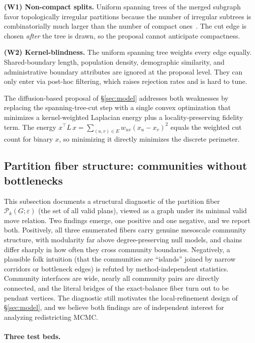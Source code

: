 \documentclass[11pt]{article}
\begin{document}
\textbf{(W1) Non-compact splits.} Uniform spanning trees of the
merged subgraph favor topologically irregular partitions because the
number of irregular subtrees is combinatorially much larger than the
number of compact ones~\cite{deford2021recombination,deford2019total}.
The cut edge is chosen \emph{after} the tree is drawn, so the
proposal cannot anticipate compactness.

\textbf{(W2) Kernel-blindness.} The uniform spanning tree weights
every edge equally. Shared-boundary length, population density,
demographic similarity, and administrative boundary attributes are
ignored at the proposal level. They can only enter via post-hoc
filtering, which raises rejection rates and is hard to tune.

The diffusion-based proposal of \S\ref{sec:model} addresses both
weaknesses by replacing the spanning-tree-cut step with a single
convex optimization that minimizes a kernel-weighted Laplacian energy
plus a locality-preserving fidelity term. The energy
$x^\top L\, x = \sum_{(u,v) \in E} w_{uv} (x_u - x_v)^2$ equals the
weighted cut count for binary $x$, so minimizing it directly minimizes
the discrete perimeter.

\subsection{Partition fiber structure: communities without bottlenecks}\label{sec:fiber-corridors}

This subsection documents a structural diagnostic of the partition fiber
$\mathcal{P}_k(G; \varepsilon)$ (the set of all valid plans), viewed as a graph under its minimal
valid move relation. Two findings emerge, one positive and one
negative, and we report both. Positively, all three enumerated fibers
carry genuine mesoscale community structure, with modularity far above
degree-preserving null models, and chains differ sharply in how often
they cross community boundaries. Negatively, a plausible folk
intuition (that the communities are ``islands'' joined by narrow
corridors or bottleneck edges) is refuted by method-independent
statistics. Community interfaces are wide, nearly all community pairs
are directly connected, and the literal bridges of the exact-balance
fiber turn out to be pendant vertices. The diagnostic still motivates
the local-refinement design of \S\ref{sec:model}, and we believe both
findings are of independent interest for analyzing redistricting
MCMC.

\paragraph{Three test beds.}\label{sec:fiber-testbeds}
\end{document}
